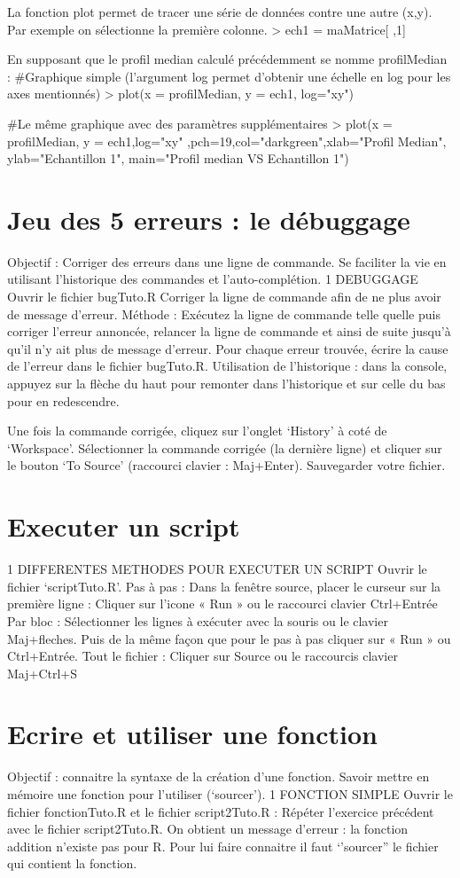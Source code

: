 La fonction plot permet de tracer une série de données contre une autre (x,y).
Par exemple on sélectionne la première colonne.
> ech1 = maMatrice[ ,1]

En supposant que le profil median calculé précédemment se nomme profilMedian :
\#Graphique simple (l'argument log permet d'obtenir une échelle en log pour les axes mentionnés)
> plot(x = profilMedian, y = ech1, log="xy")

\#Le même graphique avec des paramètres supplémentaires 
> plot(x = profilMedian, y = ech1,log="xy" ,pch=19,col="darkgreen",xlab="Profil Median", ylab="Echantillon 1", main="Profil median VS Echantillon 1")

\section{Jeu des 5 erreurs : le débuggage}
Objectif : Corriger des erreurs dans une ligne de commande. Se faciliter la vie en utilisant l'historique des commandes et l'auto-complétion.
1	DEBUGGAGE
Ouvrir le fichier bugTuto.R
Corriger la ligne de commande afin de ne plus avoir de message d'erreur.
Méthode : Exécutez la ligne de commande telle quelle  puis corriger l'erreur annoncée, relancer la ligne de commande et ainsi de suite jusqu'à qu'il n'y ait plus de message d'erreur. Pour chaque erreur trouvée, écrire la cause de l'erreur dans le fichier bugTuto.R.
Utilisation de l'historique : dans la console, appuyez sur la flèche du haut pour remonter dans l'historique et sur celle du bas pour en redescendre.

Une fois la commande corrigée, cliquez sur l'onglet ‘History' à coté de ‘Workspace'. Sélectionner la commande corrigée (la dernière ligne) et cliquer sur le bouton ‘To Source' (raccourci clavier : Maj+Enter).
Sauvegarder votre fichier.
\section{Executer un script}
1	DIFFERENTES METHODES POUR EXECUTER UN SCRIPT 
Ouvrir le fichier ‘scriptTuto.R'.
Pas à pas :
Dans la fenêtre source, placer le curseur sur la première ligne :
Cliquer sur l'icone « Run » ou le raccourci clavier Ctrl+Entrée
Par bloc :
	Sélectionner les lignes à exécuter avec la souris ou le clavier Maj+fleches.
	Puis de la même façon que pour le pas à pas cliquer sur « Run » ou Ctrl+Entrée.
Tout le fichier :
	Cliquer sur Source ou le raccourcis clavier Maj+Ctrl+S


\section{Ecrire et utiliser une fonction}
Objectif : connaitre la syntaxe de la création d'une fonction. Savoir mettre en mémoire une fonction pour l'utiliser (‘sourcer').
1	FONCTION SIMPLE 
Ouvrir le fichier fonctionTuto.R et le fichier script2Tuto.R :
Répéter l'exercice précédent avec le fichier script2Tuto.R.
On obtient un message d'erreur :  la fonction addition n'existe pas pour R. Pour lui faire connaitre il faut ‘'sourcer'' le fichier qui contient la fonction.

